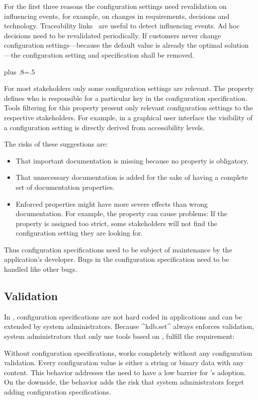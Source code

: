 For the first three reasons the configuration settings need revalidation on influencing events, for example, on changes in requirements, decisions and technology.
Traceability links~\cite{ramesh2001toward} are useful to detect influencing events.
Ad hoc decisions need to be revalidated periodically.
If customers never change configuration settings---because the default value is already the optimal solution---the configuration setting and specification shall be removed.%
{\parfillskip=0pt plus .8\textwidth \emergencystretch=.5\textwidth \par}

For most stakeholders only some configuration settings are relevant.
The property  defines who is responsible for a particular key in the configuration specification.
Tools filtering for this property present only relevant configuration settings to the respective stakeholders.
For example, in a graphical user interface the visibility of a configuration setting is directly derived from accessibility levels.

The risks of these suggestions are:
\begin{itemize}
\item
That important documentation is missing because no property is obligatory.
\item
That unnecessary documentation is added for the sake of having a complete set of documentation properties.
\item
Enforced properties might have more severe effects than wrong documentation.
For example, the property  can cause problems:
If the property is assigned too strict, some stakeholders will not find the configuration setting they are looking for.
\end{itemize}
Thus configuration specifications need to be subject of maintenance by the application's developer.
Bugs in the configuration specification need to be handled like other bugs.


\subsection{Validation}

In \elektra{}, configuration specifications are not hard coded in applications and can be extended by system administrators.
Because ^kdb.set^ always enforces validation, system administrators that only use tools based on , fulfill the requirement:
\reqValidate*

Without configuration specifications, \elektra{} works completely without any configuration validation.
Every configuration value is either a string or binary data with any content.
This behavior addresses the need to have a low barrier for \elektra{}'s adoption.
On the downside, the behavior adds the risk that system administrators forget adding configuration specifications.

